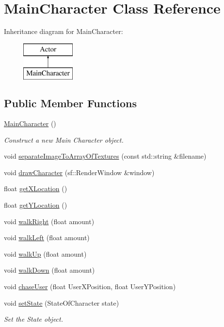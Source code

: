 \hypertarget{classMainCharacter}{}\section{Main\+Character Class Reference}
\label{classMainCharacter}
Inheritance diagram for Main\+Character\+:\begin{figure}[H]
\begin{center}
\leavevmode
\includegraphics[height=2.000000cm]{classMainCharacter}
\end{center}
\end{figure}
\subsection*{Public Member Functions}
\begin{DoxyCompactItemize}
\item 
\mbox{\hyperlink{classMainCharacter_a822c6796f6cac04dedfaa12846f1dd42}{Main\+Character}} ()
\begin{DoxyCompactList}\small\item\em Construct a new Main Character object. \end{DoxyCompactList}\item 
void \mbox{\hyperlink{classMainCharacter_accfd0235b5f57d38be77643e979c893d}{separate\+Image\+To\+Array\+Of\+Textures}} (const std\+::string \&filename)
\item 
void \mbox{\hyperlink{classMainCharacter_a88c571025d325e44d349a1e899e8b22a}{draw\+Character}} (sf\+::\+Render\+Window \&window)
\item 
float \mbox{\hyperlink{classMainCharacter_a48c6e280e68d400e3eeac2f33fb194ff}{get\+X\+Location}} ()
\item 
float \mbox{\hyperlink{classMainCharacter_aa802ffc7d85805d5dffc4d3700fcee7d}{get\+Y\+Location}} ()
\item 
void \mbox{\hyperlink{classMainCharacter_abe834fc327cbaa6192563729df589297}{walk\+Right}} (float amount)
\item 
void \mbox{\hyperlink{classMainCharacter_a469893887080b1ae57fd0efa260d1434}{walk\+Left}} (float amount)
\item 
void \mbox{\hyperlink{classMainCharacter_a23348476f59cb79981311cac30266ed5}{walk\+Up}} (float amount)
\item 
void \mbox{\hyperlink{classMainCharacter_afdd71154e531e45bc152c52df4d35bd2}{walk\+Down}} (float amount)
\item 
void \mbox{\hyperlink{classMainCharacter_aeb9d4174780f4cdc1901e9d0597b6da8}{chase\+User}} (float User\+X\+Position, float User\+Y\+Position)
\item 
void \mbox{\hyperlink{classMainCharacter_a557d59154e4d12af391ee5d218b7dcc8}{set\+State}} (State\+Of\+Character state)
\begin{DoxyCompactList}\small\item\em Set the State object. \end{DoxyCompactList}\end{DoxyCompactItemize}
